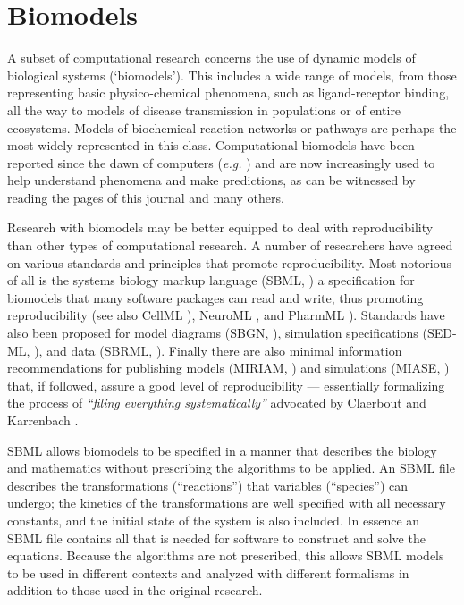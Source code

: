 \section{Biomodels}
\label{sec:biomodels}
A subset of computational research concerns the use of dynamic models of biological systems (`biomodels'). This includes a wide range of models, from those representing basic physico-chemical phenomena, such as ligand-receptor binding, all the way to models of disease transmission in populations or of entire ecosystems. Models of biochemical reaction networks or pathways are perhaps the most widely represented in this class. Computational biomodels have been reported since the dawn of computers ({\it e.g.} \cite{chance1960}) and are now increasingly used to help understand phenomena and make predictions, as can be witnessed by reading the pages of this journal and many others.
 
Research with biomodels may be better equipped to deal with reproducibility than other types of computational research. A  number of researchers have agreed on various standards and principles that promote reproducibility. Most notorious of all is the systems biology markup language (SBML, \cite{hucka2003}) a specification for biomodels that many software packages can read and write, thus promoting reproducibility (see also CellML \cite{lloyd2004}), NeuroML \cite{gleeson2010}, and PharmML \cite{swat2015}).  Standards have also been proposed for model diagrams (SBGN, \cite{le_novere2009}), simulation specifications (SED-ML, \cite{waltemath2011}), and data (SBRML, \cite{dada2010}). Finally there are also minimal information recommendations for publishing models (MIRIAM, \cite{miriam2005}) and simulations (MIASE, \cite{miase2011}) that, if followed, assure a good level of reproducibility --- essentially formalizing the process of {\it ``filing everything systematically''} advocated by Claerbout and Karrenbach \cite{claerbout1992}.

SBML allows biomodels to be specified in a manner that describes the biology and mathematics without prescribing the algorithms to be applied. An SBML file describes the transformations (``reactions'') that variables (``species'') can undergo; the kinetics of the transformations are well specified with all necessary constants, and the initial state of the system is also included. In essence an SBML file contains all that is needed for software to construct and solve the equations. Because the algorithms are not prescribed, this allows SBML models to be used in different contexts and analyzed with different formalisms in addition to those used in the original research.


